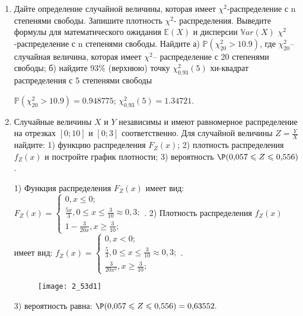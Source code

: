 \documentclass[a4paper,12pt]{article}
\begin{document}
\begin{enumerate}


\item


Дайте определение случайной величины, которая имеет $\chi ^{2}$-распределение с n степенями свободы.
Запишите плотность $\chi ^{2}$- распределения. Выведите формулы для математического ожидания $\mathbb{E}(X)$ и дисперсии $\mathbb{V}ar(X)$ $\chi ^{2}$-распределение с n степенями свободы. Найдите а) $\mathbb{P}(\chi _{20}^{2} > 10.9)$, где $\chi _{20}^{2}$–случайная величина, которая имеет $\chi ^{2}$– распределение с 20 степенями свободы; б) найдите 93\%
(верхнюю) точку $\chi _{0.93}^{2} (5)$ хи-квадрат распределения с 5 степенями свободы




$\mathbb{P}(\chi _{20}^{2} > 10.9) =  0.948775$; $\chi _{0.93}^{2} (5) = 1.34721$.


\item

Случайные величины $X$ и $Y$ независимы и имеют равномерное
распределение на отрезках $[0;10]$ и $[0;3]$ соответственно. Для случайной величины $Z=\frac{Y}{X}$ найдите: 
1) функцию распределения $F_Z(x)$;
2) плотность распределения $f_Z(x)$ и постройте график плотности;
3) вероятность $\P(0,\!057\leqslant Z\leqslant 0,\!556)$.




1) Функция распределения $F_Z(x)$ имеет вид:
$
F_Z(x)=\left\{
\begin{array}{l}
0, x\leqslant 0;\\
\frac{5 x}{3}, 0\leqslant x\leqslant \frac{3}{10}\approx 0,\!3;\\
1 - \frac{3}{20 x}, x\geqslant\frac{3}{10};
\end{array}.
\right.
$
2) Плотность распределения $f_Z(x)$ имеет вид:
$
f_Z(x)=\left\{
\begin{array}{l}
0, x<0;\\
\frac{5}{3}, 0\leqslant x\leqslant \frac{3}{10}\approx 0,\!3;\\
\frac{3}{20 x^{2}}, x\geqslant\frac{3}{10};
\end{array}.
\right.
$


\begin{figure}[H]
    \texttt{[image: 2\_53d1]}
\end{figure}


3) вероятность равна:
$
\P(0,\!057\leqslant Z\leqslant 0,\!556)=
0,\!63552.
$



\end{enumerate}
\end{document}
